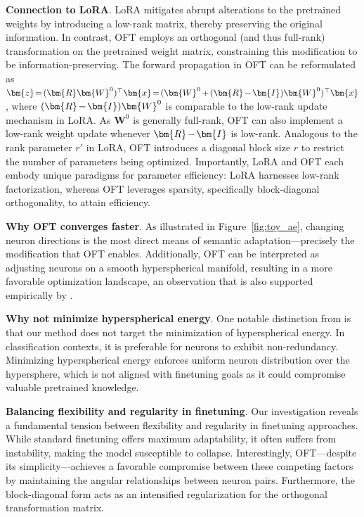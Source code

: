 {\textbf{Connection to LoRA}. LoRA mitigates abrupt alterations to the pretrained weights by introducing a low-rank matrix, thereby preserving the original information. In contrast, OFT employs an orthogonal (and thus full-rank) transformation on the pretrained weight matrix, constraining this modification to be information-preserving. The forward propagation in OFT can be reformulated as $\thickmuskip=2mu \medmuskip=2mu \bm{z}=(\bm{R}\bm{W}^0)^\top\bm{x}=(\bm{W}^0+(\bm{R}-\bm{I})\bm{W}^0)^\top\bm{x}$, where $\thickmuskip=2mu \medmuskip=2mu (\bm{R}-\bm{I})\bm{W}^0$ is comparable to the low-rank update mechanism in LoRA. As $\bm{W}^0$ is generally full-rank, OFT can also implement a low-rank weight update whenever $\thickmuskip=2mu \medmuskip=2mu \bm{R}-\bm{I}$ is low-rank. Analogous to the rank parameter $r'$ in LoRA, OFT introduces a diagonal block size $r$ to restrict the number of parameters being optimized. Importantly, LoRA and OFT each embody unique paradigms for parameter efficiency: LoRA harnesses low-rank factorization, whereas OFT leverages sparsity, specifically block-diagonal orthogonality, to attain efficiency.

\textbf{Why OFT converges faster}. As illustrated in Figure~\ref{fig:toy_ae}, changing neuron directions is the most direct means of semantic adaptation—precisely the modification that OFT enables. Additionally, OFT can be interpreted as adjusting neurons on a smooth hyperspherical manifold, resulting in a more favorable optimization landscape, an observation that is also supported empirically by \cite{liu2021orthogonal}.

\textbf{Why not minimize hyperspherical energy}. One notable distinction from \cite{liu2021orthogonal} is that our method does not target the minimization of hyperspherical energy. In classification contexts, it is preferable for neurons to exhibit non-redundancy. Minimizing hyperspherical energy enforces uniform neuron distribution over the hypersphere, which is not aligned with finetuning goals as it could compromise valuable pretrained knowledge.

\textbf{Balancing flexibility and regularity in finetuning}. Our investigation reveals a fundamental tension between flexibility and regularity in finetuning approaches. While standard finetuning offers maximum adaptability, it often suffers from instability, making the model susceptible to collapse. Interestingly, OFT—despite its simplicity—achieves a favorable compromise between these competing factors by maintaining the angular relationships between neuron pairs. Furthermore, the block-diagonal form acts as an intensified regularization for the orthogonal transformation matrix.

}

